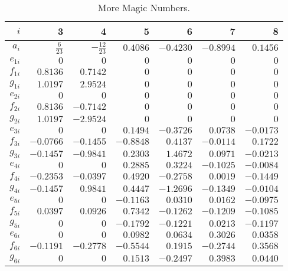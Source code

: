 \documentclass[12pt,rotate]{article}
\begin{document}
\begin{itemize}
\begin{itemize}
\begin{table}[htb]
\caption[]{More Magic Numbers.
\label{tab:akhNLO}}
\begin{center}
\begin{tabular}{|r|r|r|r|r|r|r|}
\hline
$i$ & 3 & 4 & 5 & 6 & 7 & 8 \\
\hline
$a_i $& $ \frac{6}{23} $&$
-\frac{12}{23} $&$
0.4086 $&$ -0.4230 $&$ -0.8994 $&$ 0.1456 $\\
$e_{1i} $&$ 0 $&$ 0 $&$
0 $&$ 0 $&$ 0 $&$ 0 $\\
$f_{1i} $&$ 0.8136 $&$ 0.7142 $&$
0 $&$ 0 $&$ 0 $&$ 0 $\\
$g_{1i} $&$ 1.0197 $&$ 2.9524 $&$
0 $&$ 0 $&$ 0 $&$ 0 $\\
\hline
$e_{2i} $&$ 0 $&$ 0 $&$
0 $&$ 0 $&$ 0 $&$ 0 $\\
$f_{2i} $&$ 0.8136 $&$ - 0.7142 $&$
0 $&$ 0 $&$ 0 $&$ 0 $\\
$g_{2i} $&$ 1.0197 $&$ - 2.9524 $&$
0 $&$ 0 $&$ 0 $&$ 0 $\\
\hline
$e_{3i} $&$ 0 $&$ 0 $&$
0.1494 $&$ -0.3726 $&$ 0.0738 $&$ -0.0173 $\\
$f_{3i} $&$ -0.0766 $&$ - 0.1455 $&$
-0.8848 $&$ 0.4137 $&$ -0.0114 $&$ 0.1722 $\\
$g_{3i} $&$ -0.1457 $&$ - 0.9841 $&$
0.2303 $&$ 1.4672 $&$ 0.0971 $&$ -0.0213 $\\
\hline
$e_{4i} $&$ 0 $&$ 0 $&$
0.2885 $&$ 0.3224 $&$ -0.1025 $&$ -0.0084 $\\
$f_{4i} $&$ -0.2353 $&$ - 0.0397 $&$
0.4920 $&$ -0.2758 $&$ 0.0019 $&$-0.1449 $\\
$g_{4i} $&$ -0.1457 $&$ 0.9841 $&$
0.4447 $&$ -1.2696 $&$ -0.1349 $&$ -0.0104 $\\
\hline
$e_{5i} $&$ 0 $&$ 0 $&$
-0.1163 $&$ 0.0310 $&$ 0.0162 $&$ -0.0975 $\\
$f_{5i} $&$ 0.0397 $&$  0.0926 $&$
0.7342 $&$ -0.1262 $&$ -0.1209 $&$ -0.1085 $\\
$g_{5i} $&$ 0 $&$ 0 $&$
-0.1792 $&$ -0.1221 $&$ 0.0213 $&$ -0.1197 $\\
\hline
$e_{6i} $&$ 0 $&$ 0 $&$
0.0982 $&$ 0.0634 $&$ 0.3026 $&$ 0.0358 $\\
$f_{6i} $&$ -0.1191 $&$ - 0.2778 $&$
-0.5544 $&$ 0.1915 $&$ -0.2744 $&$ 0.3568 $\\
$g_{6i} $&$ 0 $&$ 0 $&$
0.1513 $&$ -0.2497 $&$ 0.3983 $&$ 0.0440 $\\
\hline
\end{tabular}
\end{center}
\end{table}


\end{itemize}
\end{itemize}
\end{document}
